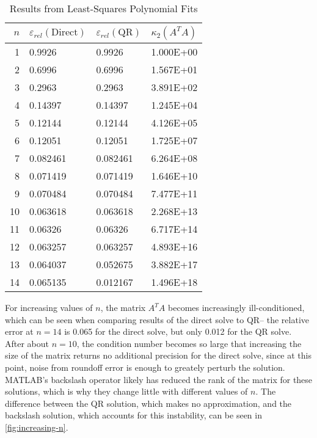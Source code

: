 \documentclass{template}
\begin{document}
\begin{table}
  \centering
    \caption{Results from Least-Squares Polynomial Fits}\label{tab:lsqr-results}
  \begin{tabular}{r||ll|l}
    $n$ & $\varepsilon_{rel}(\text{Direct})$ & $\varepsilon_{rel}(\text{QR})$ & $\kappa_2(A^T A)$\\
    \hline
     1&0.9926&0.9926&1.000E+00\\
     2&0.6996&0.6996&1.567E+01\\
     3&0.2963&0.2963&3.891E+02\\
     4&0.14397&0.14397&1.245E+04\\
     5&0.12144&0.12144&4.126E+05\\
     6&0.12051&0.12051&1.725E+07\\
     7&0.082461&0.082461&6.264E+08\\
     8&0.071419&0.071419&1.646E+10\\
     9&0.070484&0.070484&7.477E+11\\
     10&0.063618&0.063618&2.268E+13\\
     11&0.06326&0.06326&6.717E+14\\
     12&0.063257&0.063257&4.893E+16\\
     13&0.064037&0.052675&3.882E+17\\
    14&0.065135&0.012167&1.496E+18\\
  \end{tabular} 
\end{table}

For increasing values of $n$, the matrix $A^T A$ becomes increasingly ill-conditioned, which can be seen when comparing results of the direct solve to QR-- the relative error at $n=14$ is 0.065 for the direct solve, but only 0.012 for the QR solve. After about $n=10$, the condition number becomes so large that increasing the size of the matrix returns no additional precision for the direct solve, since at this point, noise from roundoff error is enough to greately perturb the solution. MATLAB's backslash operator likely has reduced the rank of the matrix for these solutions, which is why they change little with different values of $n$. The difference between the QR solution, which makes no approximation, and the backslash solution, which accounts for this instability, can be seen in \autoref{fig:increasing-n}.
\end{document}
